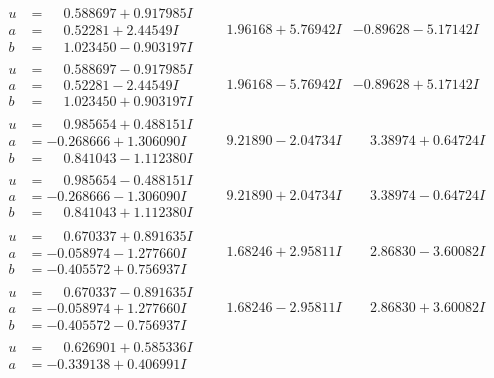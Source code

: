 \documentclass[1p]{elsarticle_modified}
\theoremstyle{definition}
\begin{document}
$$\begin{array}{c|c|c}
\begin{aligned}
u &= \phantom{-}0.588697 + 0.917985 I \\
a &= \phantom{-}0.52281 + 2.44549 I \\
b &= \phantom{-}1.023450 - 0.903197 I\end{aligned}
 & \phantom{-}1.96168 + 5.76942 I & -0.89628 - 5.17142 I \\ \hline\begin{aligned}
u &= \phantom{-}0.588697 - 0.917985 I \\
a &= \phantom{-}0.52281 - 2.44549 I \\
b &= \phantom{-}1.023450 + 0.903197 I\end{aligned}
 & \phantom{-}1.96168 - 5.76942 I & -0.89628 + 5.17142 I \\ \hline\begin{aligned}
u &= \phantom{-}0.985654 + 0.488151 I \\
a &= -0.268666 + 1.306090 I \\
b &= \phantom{-}0.841043 - 1.112380 I\end{aligned}
 & \phantom{-}9.21890 - 2.04734 I & \phantom{-}3.38974 + 0.64724 I \\ \hline\begin{aligned}
u &= \phantom{-}0.985654 - 0.488151 I \\
a &= -0.268666 - 1.306090 I \\
b &= \phantom{-}0.841043 + 1.112380 I\end{aligned}
 & \phantom{-}9.21890 + 2.04734 I & \phantom{-}3.38974 - 0.64724 I \\ \hline\begin{aligned}
u &= \phantom{-}0.670337 + 0.891635 I \\
a &= -0.058974 - 1.277660 I \\
b &= -0.405572 + 0.756937 I\end{aligned}
 & \phantom{-}1.68246 + 2.95811 I & \phantom{-}2.86830 - 3.60082 I \\ \hline\begin{aligned}
u &= \phantom{-}0.670337 - 0.891635 I \\
a &= -0.058974 + 1.277660 I \\
b &= -0.405572 - 0.756937 I\end{aligned}
 & \phantom{-}1.68246 - 2.95811 I & \phantom{-}2.86830 + 3.60082 I \\ \hline\begin{aligned}
u &= \phantom{-}0.626901 + 0.585336 I \\
a &= -0.339138 + 0.406991 I \\

\end{aligned}
\end{array}$$
\end{document}
